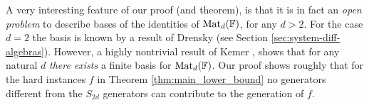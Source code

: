 \documentclass[12pt,reqno]{article}
\newtheorem*{theorem*}{Theorem}
\newcommand\F{\ensuremath{\mathbb F}}
\newcommand{\matd}{{\ensuremath{{\rm Mat}_d(\F)}}}
\newcommand{\set}[1]{\left\{#1\right\}}
\begin{document}




A very interesting feature of our proof (and theorem), is that it is in fact an \textit{open problem }to describe bases of the identities of \matd, for any $d>2$. For the case $d=2$ the basis is known by a result of Drensky \cite{Dre81} (see  Section \ref{sec:system-diff-algebras}). However,  a highly nontrivial result of Kemer \cite{Kem87}, shows that for any natural $d$ \emph{there exists} a finite basis for \matd. Our proof shows roughly that for the hard instances $f$ in Theorem \ref{thm:main_lower_bound} no generators different from the  $S_{2d}$ generators can contribute to the generation of $f$.
\smallskip

%
%
%
%
\end{document}
